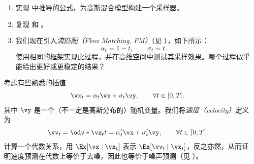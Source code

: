 \documentclass[../../book-main_zh.tex]{subfiles}
\begin{document}
    \begin{exercise}\label{exercise:implement_denoising_processes}
        \phantom{}
        \begin{enumerate}
            \item 实现  中推导的公式，为高斯混合模型构建一个采样器。
            \item 复现  和 。
            \item 我们现在引入\textit{流匹配（Flow Matching, FM）}（见 ），如下所示：
                \begin{equation}
                    \alpha_{t} = 1 - t, \qquad \sigma_{t} = t.
                \end{equation}
                使用相同的框架实现此过程，并在高维空间中测试其采样效果。哪个过程似乎能给出更好或更稳定的结果？
        \end{enumerate}
    \end{exercise}

    \begin{exercise}\label{exercise:velocity_prediction}
        考虑有些熟悉的插值
        \begin{equation}
            \vx_{t} = \alpha_{t}\vx + \sigma_{t}\vy, \qquad \forall t
            \in [0, T].
        \end{equation}
        其中 \(\vy\) 是一个（不一定是高斯分布的）随机变量。我们将\textit{速度（velocity）}定义为
        \begin{equation}
            \vv_{t} = \odv*{\vx_{t}}{t} = \alpha_{t}^{\prime}\vx +
            \sigma_{t}^{\prime}\vy, \qquad \forall t \in [0, T].
        \end{equation}
        计算一个代数关系，用 \(\Ex[\vx \mid \vx_{t}]\) 表示 \(\Ex[\vv_{t} \mid \vx_{t}]\)，反之亦然，从而证明速度预测在代数上等价于去噪，因此也等价于噪声预测（见 ）。
    \end{exercise}

    
\end{document}
